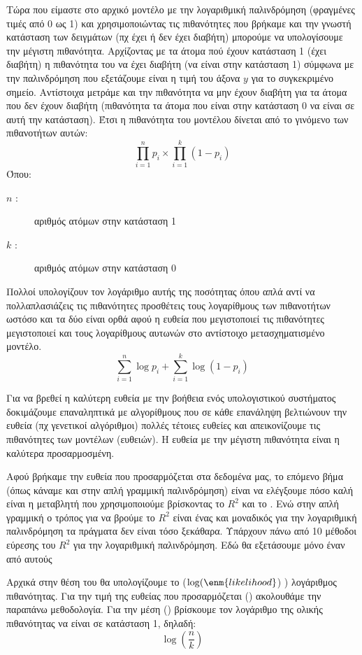 Τώρα που είμαστε στο αρχικό μοντέλο με την λογαριθμική παλινδρόμηση (φραγμένες τιμές
από 0 ως 1) και χρησιμοποιώντας τις πιθανότητες που βρήκαμε και την γνωστή κατάσταση
των δειγμάτων (πχ έχει ή δεν έχει διαβήτη) μπορούμε να υπολογίσουμε την μέγιστη
πιθανότητα. Αρχίζοντας με τα άτομα πού έχουν κατάσταση 1 (έχει διαβήτη) η πιθανότητα του
να έχει διαβήτη (να είναι στην κατάσταση 1) σύμφωνα με την παλινδρόμηση που εξετάζουμε
είναι η τιμή του άξονα $y$ για το συγκεκριμένο σημείο. Αντίστοιχα μετράμε και την πιθανότητα
να μην έχουν διαβήτη για τα άτομα που δεν έχουν διαβήτη (πιθανότητα τα άτομα που είναι
στην κατάσταση 0 να είναι σε αυτή την κατάσταση). Έτσι η πιθανότητα του μοντέλου δίνεται
από το γινόμενο των πιθανοτήτων αυτών:
$$\prod\limits_{i=1}^np_i\times\prod\limits_{i=1}^k(1-p_i)$$
Όπου:
\begin{description}
    \item[$n$ :] αριθμός ατόμων στην κατάσταση 1
    \item[$k$ :] αριθμός ατόμων στην κατάσταση 0
\end{description}

Πολλοί υπολογίζουν τον λογάριθμο αυτής της ποσότητας όπου απλά αντί να
πολλαπλασιάζεις τις πιθανότητες προσθέτεις τους λογαρίθμους των πιθανοτήτων ωστόσο
και τα δύο είναι ορθά αφού η ευθεία που μεγιστοποιεί τις πιθανότητες μεγιστοποιεί και τους
λογαρίθμους αυτωνών στο αντίστοιχο μετασχηματισμένο μοντέλο.
$$\sum\limits_{i=1}^n\log p_i+\sum\limits_{i=1}^k\log(1-p_i)$$

Για να βρεθεί η καλύτερη ευθεία με την βοήθεια ενός υπολογιστικού συστήματος
δοκιμάζουμε επαναληπτικά με  αλγορίθμους που σε κάθε επανάληψη
βελτιώνουν την ευθεία (πχ γενετικοί αλγόριθμοι) πολλές τέτοιες ευθείες και απεικονίζουμε
τις πιθανότητες των μοντέλων (ευθειών). Η ευθεία με την μέγιστη πιθανότητα είναι η
καλύτερα προσαρμοσμένη.

Αφού βρήκαμε την ευθεία που προσαρμόζεται στα δεδομένα μας, το επόμενο βήμα (όπως
κάναμε και στην απλή γραμμική παλινδρόμηση) είναι να ελέγξουμε πόσο καλή είναι η
μεταβλητή που χρησιμοποιούμε βρίσκοντας το $R^2$
και το . Ενώ στην απλή γραμμική ο
τρόπος για να βρούμε το $R^2$
είναι ένας και μοναδικός για την λογαριθμική παλινδρόμηση τα
πράγματα δεν είναι τόσο ξεκάθαρα. Υπάρχουν πάνω από 10 μέθοδοι εύρεσης του $R^2$
για την
λογαριθμική παλινδρόμηση. Εδώ θα εξετάσουμε μόνο έναν από αυτούς

Αρχικά στην θέση του  θα υπολογίζουμε το  ($\log(\enm{likelihood}$) ) λογάριθμος πιθανότητας.
Για την τιμή  της ευθείας που προσαρμόζεται () ακολουθάμε την παραπάνω μεθοδολογία.
Για την μέση () βρίσκουμε τον λογάριθμο της ολικής πιθανότητας να είναι σε κατάσταση
1, δηλαδή:
$$\log\left(\frac{n}{k}\right)$$

